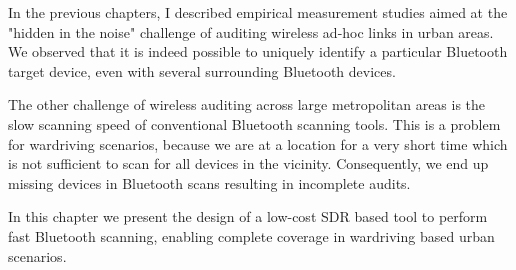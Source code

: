 In the previous chapters, I described empirical measurement studies aimed at  the "hidden in the noise" challenge of auditing wireless ad-hoc links in urban areas. We observed that it is indeed possible to uniquely identify a particular Bluetooth target device, even with several surrounding Bluetooth devices.
%

The other challenge of wireless auditing across large metropolitan areas is the slow scanning speed of conventional Bluetooth scanning tools. 
%
This is a problem for wardriving scenarios, because we are at a location for a very short time which is not sufficient to scan for all devices in the vicinity.
%
Consequently, we end up missing devices in Bluetooth scans resulting in incomplete audits.

In this chapter we present the design of a low-cost SDR based tool to perform fast Bluetooth scanning, enabling complete coverage in wardriving based urban scenarios.
